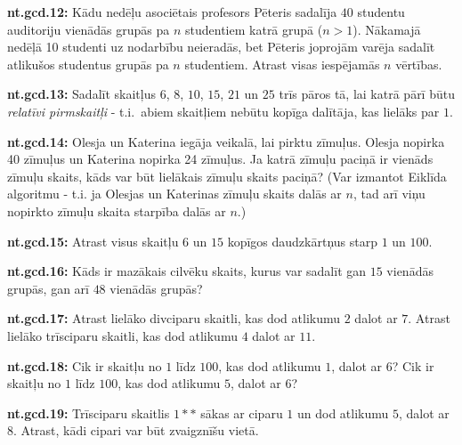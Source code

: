 \documentclass[11pt]{article}
\newenvironment{uzdevums}[1][\unskip]{%
\vspace{3mm}
\noindent
\textbf{#1:}
\noindent}
{}
\begin{document}
\begin{uzdevums}[nt.gcd.12]
Kādu nedēļu asociētais profesors Pēteris sadalīja $40$ studentu auditoriju vienādās grupās pa $n$ studentiem katrā grupā
($n > 1$). Nākamajā nedēļā 10 studenti uz nodarbību neieradās, bet Pēteris joprojām varēja 
sadalīt atlikušos studentus grupās pa $n$ studentiem. Atrast visas iespējamās $n$ vērtības. 
\end{uzdevums}

\begin{uzdevums}[nt.gcd.13]
Sadalīt skaitļus $6$, $8$, $10$, $15$, $21$ un $25$ trīs pāros tā, lai katrā pārī 
būtu {\em relatīvi pirmskaitļi} - t.i.\ abiem skaitļiem nebūtu kopīga dalītāja, kas lielāks par $1$. 
\end{uzdevums}

\begin{uzdevums}[nt.gcd.14]
Olesja un Katerina iegāja veikalā, lai pirktu zīmuļus. Olesja nopirka 40 zīmuļus un Katerina nopirka 24 zīmuļus. 
Ja katrā zīmuļu paciņā ir vienāds zīmuļu skaits, kāds var būt lielākais zīmuļu skaits paciņā? 
(Var izmantot Eiklīda algoritmu - t.i. ja Olesjas un Katerinas zīmuļu skaits dalās ar $n$, 
tad arī viņu nopirkto zīmuļu skaita starpība dalās ar $n$.) 
\end{uzdevums}

\begin{uzdevums}[nt.gcd.15]
Atrast visus skaitļu $6$ un $15$ kopīgos daudzkārtņus starp $1$ un $100$. 
\end{uzdevums}

\begin{uzdevums}[nt.gcd.16]
Kāds ir mazākais cilvēku skaits, kurus var sadalīt gan $15$ vienādās grupās, gan arī $48$ vienādās grupās? 
\end{uzdevums}

\begin{uzdevums}[nt.gcd.17]
Atrast lielāko divciparu skaitli, kas dod atlikumu $2$ dalot ar $7$. 
Atrast lielāko trīsciparu skaitli, kas dod atlikumu $4$ dalot ar $11$. 
\end{uzdevums}

\begin{uzdevums}[nt.gcd.18]
Cik ir skaitļu no $1$ līdz $100$, kas dod atlikumu $1$, dalot ar $6$? 
Cik ir skaitļu no $1$ līdz $100$, kas dod atlikumu $5$, dalot ar $6$? 
\end{uzdevums}

\begin{uzdevums}[nt.gcd.19]
Trīsciparu skaitlis $1\ast\ast$ sākas ar ciparu $1$ un dod atlikumu $5$, dalot ar $8$. 
Atrast, kādi cipari var būt zvaigznīšu vietā. 
\end{uzdevums}
\end{document}
